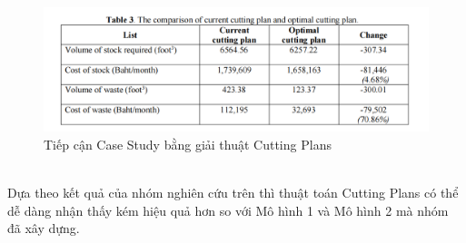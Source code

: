 \documentclass[a4paper]{article}
\begin{document}
\begin{figure}[http]
    \centering
    \includegraphics[width=1\linewidth]{CuttingPlans.png}
    \caption{Tiếp cận Case Study bằng giải thuật Cutting Plans}
    \label{fig:enter-label}
\end{figure}
\\
\indent Dựa theo kết quả của nhóm nghiên cứu trên thì thuật toán Cutting Plans có thể dễ dàng nhận thấy kém hiệu quả hơn so với Mô hình 1 và Mô hình 2 mà nhóm đã xây dựng.
\end{document}

